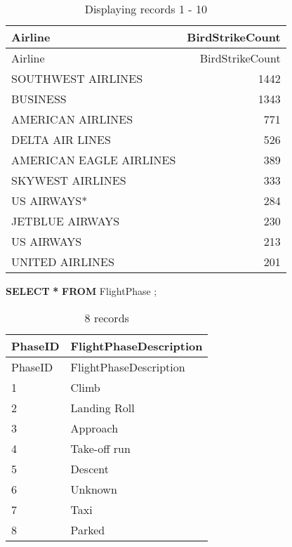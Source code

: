 \documentclass[
]{article}
\newenvironment{Shaded}{\begin{snugshade}}{\end{snugshade}}
\newcommand{\KeywordTok}[1]{\textcolor[rgb]{0.13,0.29,0.53}{\textbf{#1}}}
\newcommand{\NormalTok}[1]{#1}
\newcommand{\OperatorTok}[1]{\textcolor[rgb]{0.81,0.36,0.00}{\textbf{#1}}}
\begin{document}
\begin{longtable}[]{@{}lr@{}}
\caption{Displaying records 1 - 10}\tabularnewline
\toprule()
Airline & BirdStrikeCount \\
\midrule()
\endfirsthead
\toprule()
Airline & BirdStrikeCount \\
\midrule()
\endhead
SOUTHWEST AIRLINES & 1442 \\
BUSINESS & 1343 \\
AMERICAN AIRLINES & 771 \\
DELTA AIR LINES & 526 \\
AMERICAN EAGLE AIRLINES & 389 \\
SKYWEST AIRLINES & 333 \\
US AIRWAYS* & 284 \\
JETBLUE AIRWAYS & 230 \\
US AIRWAYS & 213 \\
UNITED AIRLINES & 201 \\
\bottomrule()
\end{longtable}

\begin{Shaded}
\begin{Highlighting}[]
\KeywordTok{SELECT} \OperatorTok{*} 
\KeywordTok{FROM}\NormalTok{ FlightPhase}
\NormalTok{;}
\end{Highlighting}
\end{Shaded}

\begin{longtable}[]{@{}ll@{}}
\caption{8 records}\tabularnewline
\toprule()
PhaseID & FlightPhaseDescription \\
\midrule()
\endfirsthead
\toprule()
PhaseID & FlightPhaseDescription \\
\midrule()
\endhead
1 & Climb \\
2 & Landing Roll \\
3 & Approach \\
4 & Take-off run \\
5 & Descent \\
6 & Unknown \\
7 & Taxi \\
8 & Parked \\
\bottomrule()
\end{longtable}
\end{document}
